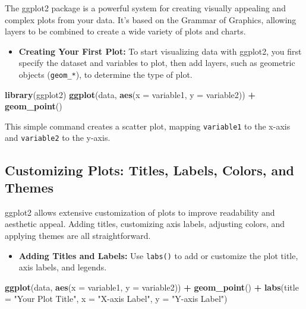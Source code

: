\documentclass[
]{book}
\newenvironment{Shaded}{\begin{snugshade}}{\end{snugshade}}
\newcommand{\AttributeTok}[1]{\textcolor[rgb]{0.13,0.29,0.53}{#1}}
\newcommand{\FunctionTok}[1]{\textcolor[rgb]{0.13,0.29,0.53}{\textbf{#1}}}
\newcommand{\NormalTok}[1]{#1}
\newcommand{\SpecialCharTok}[1]{\textcolor[rgb]{0.81,0.36,0.00}{\textbf{#1}}}
\newcommand{\StringTok}[1]{\textcolor[rgb]{0.31,0.60,0.02}{#1}}
\providecommand{\tightlist}{%
  \setlength{\itemsep}{0pt}\setlength{\parskip}{0pt}}
\begin{document}
The ggplot2 package is a powerful system for creating visually appealing and complex plots from your data. It's based on the Grammar of Graphics, allowing layers to be combined to create a wide variety of plots and charts.

\begin{itemize}
\tightlist
\item
  \textbf{Creating Your First Plot:} To start visualizing data with ggplot2, you first specify the dataset and variables to plot, then add layers, such as geometric objects (\texttt{geom\_*}), to determine the type of plot.
\end{itemize}

\begin{Shaded}
\begin{Highlighting}[]
\FunctionTok{library}\NormalTok{(ggplot2)}
\FunctionTok{ggplot}\NormalTok{(data, }\FunctionTok{aes}\NormalTok{(}\AttributeTok{x =}\NormalTok{ variable1, }\AttributeTok{y =}\NormalTok{ variable2)) }\SpecialCharTok{+} 
  \FunctionTok{geom\_point}\NormalTok{()}
\end{Highlighting}
\end{Shaded}

This simple command creates a scatter plot, mapping \texttt{variable1} to the x-axis and \texttt{variable2} to the y-axis.

\hypertarget{customizing-plots-titles-labels-colors-and-themes}{%
\subsection*{Customizing Plots: Titles, Labels, Colors, and Themes}\label{customizing-plots-titles-labels-colors-and-themes}}

ggplot2 allows extensive customization of plots to improve readability and aesthetic appeal. Adding titles, customizing axis labels, adjusting colors, and applying themes are all straightforward.

\begin{itemize}
\tightlist
\item
  \textbf{Adding Titles and Labels:} Use \texttt{labs()} to add or customize the plot title, axis labels, and legends.
\end{itemize}

\begin{Shaded}
\begin{Highlighting}[]
\FunctionTok{ggplot}\NormalTok{(data, }\FunctionTok{aes}\NormalTok{(}\AttributeTok{x =}\NormalTok{ variable1, }\AttributeTok{y =}\NormalTok{ variable2)) }\SpecialCharTok{+} 
  \FunctionTok{geom\_point}\NormalTok{() }\SpecialCharTok{+}
  \FunctionTok{labs}\NormalTok{(}\AttributeTok{title =} \StringTok{"Your Plot Title"}\NormalTok{, }\AttributeTok{x =} \StringTok{"X{-}axis Label"}\NormalTok{, }\AttributeTok{y =} \StringTok{"Y{-}axis Label"}\NormalTok{)}
\end{Highlighting}
\end{Shaded}
\end{document}
